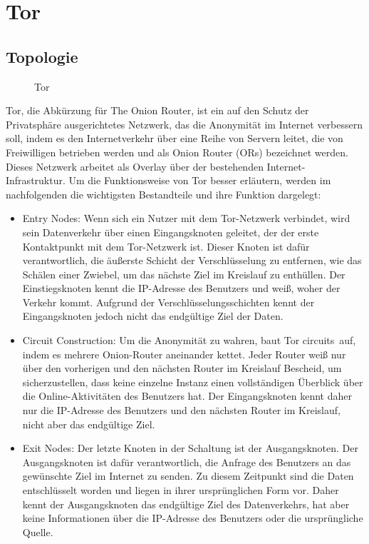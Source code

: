 \section{Tor}

\subsection{Topologie}

\begin{figure}[h!]
    \centering
    
    \caption{Tor}
    \label{imgs:tor}
\end{figure}

Tor, die Abkürzung für \glqq The Onion Router\grqq, ist ein auf den Schutz der Privatsphäre ausgerichtetes Netzwerk, das die Anonymität im Internet verbessern soll, indem es den Internetverkehr über eine Reihe von Servern leitet, die von Freiwilligen betrieben werden und als Onion Router (ORs) bezeichnet werden. Dieses Netzwerk arbeitet als Overlay über der bestehenden Internet-Infrastruktur. Um die Funktionsweise von Tor besser erläutern, werden im nachfolgenden die wichtigsten Bestandteile und ihre Funktion dargelegt:

\begin{itemize}

\item Entry Nodes: Wenn sich ein Nutzer mit dem Tor-Netzwerk verbindet, wird sein Datenverkehr über einen Eingangsknoten geleitet, der der erste Kontaktpunkt mit dem Tor-Netzwerk ist. Dieser Knoten ist dafür verantwortlich, die äußerste Schicht der Verschlüsselung zu entfernen, wie das Schälen einer Zwiebel, um das nächste Ziel im Kreislauf zu enthüllen. Der Einstiegsknoten kennt die IP-Adresse des Benutzers und weiß, woher der Verkehr kommt. Aufgrund der Verschlüsselungsschichten kennt der Eingangsknoten jedoch nicht das endgültige Ziel der Daten.

\item Circuit Construction: Um die Anonymität zu wahren, baut Tor \glqq circuits\grqq\ auf, indem es mehrere Onion-Router aneinander kettet. Jeder Router weiß nur über den vorherigen und den nächsten Router im Kreislauf Bescheid, um sicherzustellen, dass keine einzelne Instanz einen vollständigen Überblick über die Online-Aktivitäten des Benutzers hat. Der Eingangsknoten kennt daher nur die IP-Adresse des Benutzers und den nächsten Router im Kreislauf, nicht aber das endgültige Ziel.

\item Exit Nodes: Der letzte Knoten in der Schaltung ist der Ausgangsknoten. Der Ausgangsknoten ist dafür verantwortlich, die Anfrage des Benutzers an das gewünschte Ziel im Internet zu senden. Zu diesem Zeitpunkt sind die Daten entschlüsselt worden und liegen in ihrer ursprünglichen Form vor. Daher kennt der Ausgangsknoten das endgültige Ziel des Datenverkehrs, hat aber keine Informationen über die IP-Adresse des Benutzers oder die ursprüngliche Quelle.

\end{itemize}

